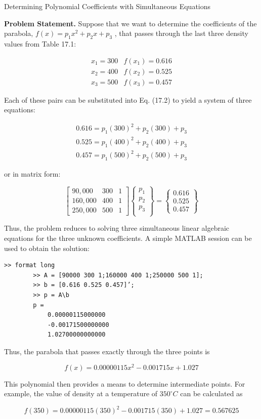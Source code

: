 \documentclass[../main.tex]{subfiles}
\begin{document}
\begin{example} Determining Polynomial Coefficients with Simultaneous Equations

	\noindent \textbf{Problem Statement. } \quad Suppose that we want to determine the coefficients of the parabola,
	$f (x) = p_1 x^2 + p_2 x + p_3$ , that passes through the last three density values from Table 17.1:

	$$
	\begin{matrix}
		x_1 = 300 & f(x_1) = 0.616 \\
		x_2 = 400 & f(x_2) = 0.525  \\
		x_3 = 500 & f(x_3) = 0.457 
	\end{matrix}
	$$

	\noindent Each of these pairs can be substituted into Eq. (17.2) to yield a system of three equations:

	$$
	\begin{matrix}
		0.616 = p_1 (300)^2 + p_2 (300) + p_3 \\
		0.525 = p_1 (400)^2 + p_2 (400) + p_3 \\
		0.457 = p_1 (500)^2 + p_2 (500) + p_3
	\end{matrix}
	$$

	\noindent or in matrix form:

	$$
	\begin{bmatrix}
		90,000 & 300 & 1  \\
		160,000 & 400 & 1  \\
		250,000 & 500 & 1
	\end{bmatrix} 
	\begin{Bmatrix}
		p_1 \\
		p_2 \\
		p_3 \\
	\end{Bmatrix} =
	\begin{Bmatrix}
		0.616 \\
		0.525 \\
		0.457
	\end{Bmatrix}
	$$

	\noindent Thus, the problem reduces to solving three simultaneous linear algebraic equations for
	the three unknown coefficients. A simple MATLAB session can be used to obtain the solution:

	\begin{lstlisting}[numbers=none]
		>> format long
		>> A = [90000 300 1;160000 400 1;250000 500 1];
		>> b = [0.616 0.525 0.457]’;
		>> p = A\b
		p =
			0.00000115000000
			-0.00171500000000
			1.02700000000000
	\end{lstlisting}

	\noindent Thus, the parabola that passes exactly through the three points is

	$$
	f (x) = 0.00000115x^2 - 0.001715x + 1.027
	$$

	\noindent This polynomial then provides a means to determine intermediate points. For example, the
	value of density at a temperature of $350 ^\circ C$ can be calculated as

	$$
	f (350) = 0.00000115(350)^2 - 0.001715(350) + 1.027 = 0.567625
	$$
	
\end{example}
\end{document}
